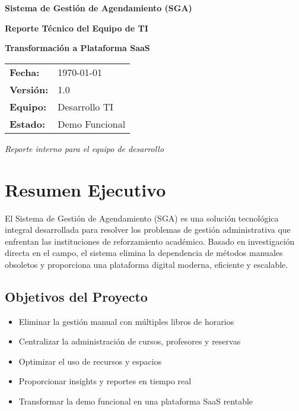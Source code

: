 \documentclass[12pt,a4paper]{article}
\begin{document}
\begin{titlepage}
    \centering
    \vspace*{2cm}
    
    {\Huge\bfseries\color{blue} Sistema de Gestión de Agendamiento (SGA)}
    
    \vspace{1cm}
    
    {\Large\textbf{Reporte Técnico del Equipo de TI}}
    
    \vspace{2cm}
    
    {\large\textbf{Transformación a Plataforma SaaS}}
    
    \vspace{3cm}
    
    \begin{tabular}{ll}
        \textbf{Fecha:} & \today \\
        \textbf{Versión:} & 1.0 \\
        \textbf{Equipo:} & Desarrollo TI \\
        \textbf{Estado:} & Demo Funcional \\
    \end{tabular}
    
    \vfill
    
    {\large\textit{Reporte interno para el equipo de desarrollo}}
    
\end{titlepage}

\tableofcontents
\newpage

\section{Resumen Ejecutivo}

El Sistema de Gestión de Agendamiento (SGA) es una solución tecnológica integral desarrollada para resolver los problemas de gestión administrativa que enfrentan las instituciones de reforzamiento académico. Basado en investigación directa en el campo, el sistema elimina la dependencia de métodos manuales obsoletos y proporciona una plataforma digital moderna, eficiente y escalable.

\subsection{Objetivos del Proyecto}
\begin{itemize}
    \item Eliminar la gestión manual con múltiples libros de horarios
    \item Centralizar la administración de cursos, profesores y reservas
    \item Optimizar el uso de recursos y espacios
    \item Proporcionar insights y reportes en tiempo real
    \item Transformar la demo funcional en una plataforma SaaS rentable
\end{itemize}
\end{document}
